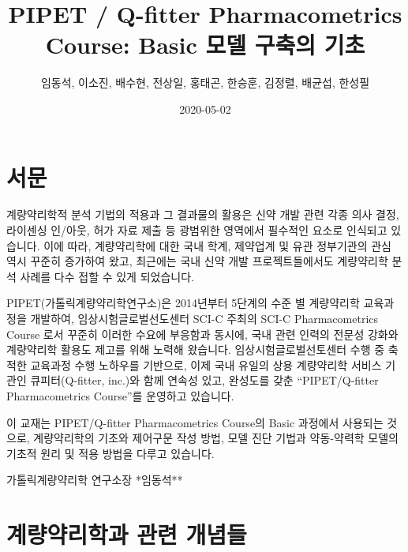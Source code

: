 \documentclass[
  10pt,
]{krantz}
\title{PIPET / Q-fitter Pharmacometrics Course: Basic 모델 구축의 기초}
\author{임동석, 이소진, 배수현, 전상일, 홍태곤, 한승훈, 김정렬, 배균섭, 한성필}
\date{2020-05-02}
\begin{document}
\maketitle

\thispagestyle{empty}
\begin{center}
\end{center}

\setlength{\abovedisplayskip}{-5pt}
\setlength{\abovedisplayshortskip}{-5pt}

{
\hypersetup{linkcolor=}
\setcounter{tocdepth}{2}
\tableofcontents
}
\listoftables
\listoffigures
{}
\hypertarget{uxc11cuxbb38}{%
\chapter*{서문}\label{uxc11cuxbb38}}


계량약리학적 분석 기법의 적용과 그 결과물의 활용은 신약 개발 관련 각종 의사 결정, 라이센싱 인/아웃, 허가 자료 제출 등 광범위한 영역에서 필수적인 요소로 인식되고 있습니다. 이에 따라, 계량약리학에 대한 국내 학계, 제약업계 및 유관 정부기관의 관심 역시 꾸준히 증가하여 왔고, 최근에는 국내 신약 개발 프로젝트들에서도 계량약리학 분석 사례를 다수 접할 수 있게 되었습니다.

PIPET(가톨릭계량약리학연구소)은 2014년부터 5단계의 수준 별 계량약리학 교육과정을 개발하여, 임상시험글로벌선도센터 SCI-C 주최의 SCI-C Pharmacometrics Course 로서 꾸준히 이러한 수요에 부응함과 동시에, 국내 관련 인력의 전문성 강화와 계량약리학 활용도 제고를 위해 노력해 왔습니다. 임상시험글로벌선토센터 수행 중 축적한 교육과정 수행 노하우를 기반으로, 이제 국내 유일의 상용 계량약리학 서비스 기관인 큐피터(Q-fitter, inc.)와 함께 연속성 있고, 완성도를 갖춘 ``PIPET/Q-fitter Pharmacometrics Course''를 운영하고 있습니다.

이 교재는 PIPET/Q-fitter Pharmacometrics Course의 Basic 과정에서 사용되는 것으로, 계량약리학의 기초와 제어구문 작성 방법, 모델 진단 기법과 약동-약력학 모델의 기초적 원리 및 적용 방법을 다루고 있습니다.

가톨릭계량약리학 연구소장 \hfill **임동석**

\mainmatter

\hypertarget{intro}{%
\chapter{계량약리학과 관련 개념들}\label{intro}}
\end{document}
